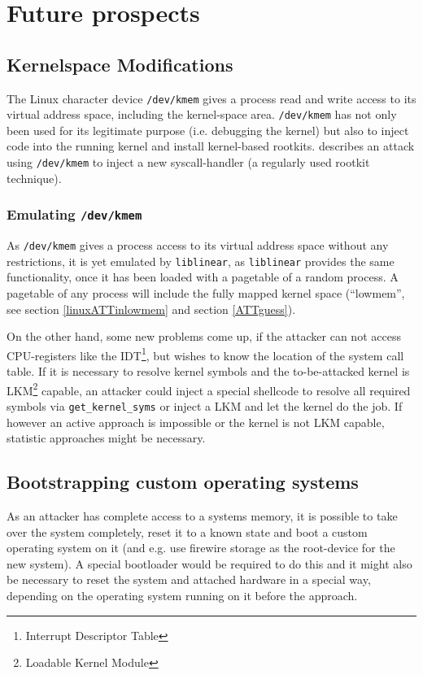 %
%

\section{Future prospects}

\label{prospects}

\subsection{Kernelspace Modifications}

The Linux character device \texttt{/dev/kmem} gives a process read and write
access to its virtual address space, including the kernel-space area.
\texttt{/dev/kmem} has not only been used for its legitimate purpose (i.e.
debugging the kernel) but also to inject code into the running kernel and
install kernel-based rootkits. \cite{phrack58.7:2001} describes an attack using
\texttt{/dev/kmem} to inject a new syscall-handler (a regularly used rootkit
technique).

\subsubsection{Emulating \texttt{/dev/kmem}}

As \texttt{/dev/kmem} gives a process access to its virtual address space
without any restrictions, it is yet emulated by \texttt{liblinear}, as
\texttt{liblinear} provides the same functionality, once it has been loaded with
a pagetable of a random process.  A pagetable of any process will include the
fully mapped kernel space (``lowmem'', see section \ref{linuxATTinlowmem} and
section \ref{ATTguess}).

On the other hand, some new problems come up, if the attacker can not access
CPU-registers like the IDT\footnote{Interrupt Descriptor Table}, but wishes to
know the location of the system call table. If it is necessary to resolve kernel
symbols and the to-be-attacked kernel is LKM\footnote{Loadable Kernel Module}
capable, an attacker could inject a special shellcode to resolve all required
symbols via \texttt{get\_kernel\_syms} or inject a LKM and let the kernel do the
job. If however an active approach is impossible or the kernel is not LKM
capable, statistic approaches might be necessary.

\subsection{Bootstrapping custom operating systems}

As an attacker has complete access to a systems memory, it is possible to take
over the system completely, reset it to a known state and boot a custom
operating system on it (and e.g. use firewire storage as the root-device for the
new system). A special bootloader would be required to do this and it might also
be necessary to reset the system and attached hardware in a special way,
depending on the operating system running on it before the approach.


